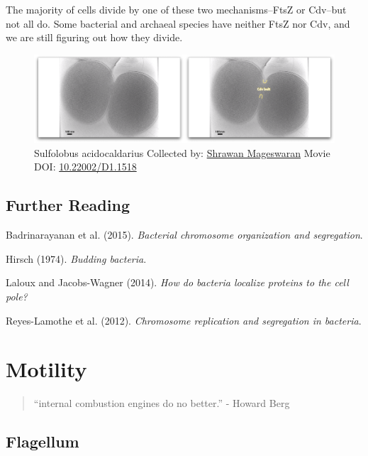 \documentclass[]{tufte-book}
\begin{document}
The majority of cells divide by one of these two mechanisms--FtsZ or
Cdv--but not all do. Some bacterial and archaeal species have neither
FtsZ nor Cdv, and we are still figuring out how they divide.





\begin{figure}
\includegraphics{movie_stills/5_12} \caption[Sulfolobus acidocaldarius Collected by:
\protect\hyperlink{shrawan_mageswaran}{Shrawan Mageswaran} Movie DOI:
\href{https://doi.org/10.22002/D1.1518}{10.22002/D1.1518}]{Sulfolobus acidocaldarius Collected by:
\protect\hyperlink{shrawan_mageswaran}{Shrawan Mageswaran} Movie DOI:
\href{https://doi.org/10.22002/D1.1518}{10.22002/D1.1518}}\label{fig:5-12}
\end{figure}

\section{Further Reading}\label{further-reading-4}

Badrinarayanan et al. (2015). \emph{Bacterial chromosome organization
and segregation}.\citep{badrinarayanan2015}

Hirsch (1974). \emph{Budding bacteria}.\citep{hirsch1974}

Laloux and Jacobs-Wagner (2014). \emph{How do bacteria localize proteins
to the cell pole?}\citep{laloux2014}

Reyes-Lamothe et al. (2012). \emph{Chromosome replication and
segregation in bacteria}.\citep{reyes-lamothe2012}

\chapter{Motility}\label{motility}

\begin{quote}
``internal combustion engines do no better.'' - Howard Berg
\citep{berg1988}
\end{quote}

\section{Flagellum}\label{flagellum}
\end{document}
